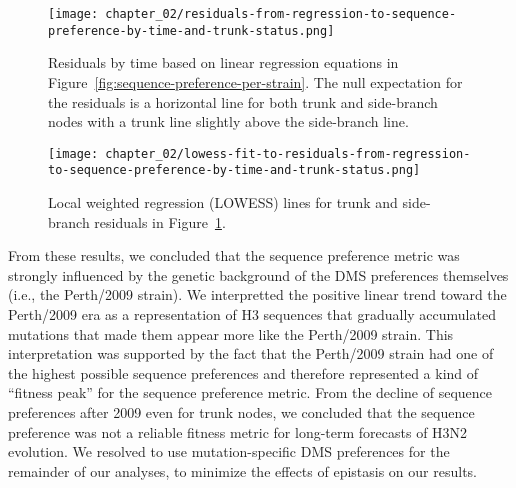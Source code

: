 \begin{figure}
  \centering
  \texttt{[image: chapter\_02/residuals-from-regression-to-sequence-preference-by-time-and-trunk-status.png]}
  \caption{\label{fig:residuals-from-regression-fit-to-sequence-preference-per-strain} Residuals by time based on linear regression equations in Figure~\ref{fig:sequence-preference-per-strain}.
    The null expectation for the residuals is a horizontal line for both trunk and side-branch nodes with a trunk line slightly above the side-branch line.}
\end{figure}

\begin{figure}
  \centering
  \texttt{[image: chapter\_02/lowess-fit-to-residuals-from-regression-to-sequence-preference-by-time-and-trunk-status.png]}
  \caption{\label{fig:lowess-residuals-from-regression-fit-to-sequence-preference-per-strain} Local weighted regression (LOWESS) lines for trunk and side-branch residuals in Figure~\ref{fig:residuals-from-regression-fit-to-sequence-preference-per-strain}.}
\end{figure}

From these results, we concluded that the sequence preference metric was strongly influenced by the genetic background of the DMS preferences themselves (i.e., the Perth/2009 strain).
We interpretted the positive linear trend toward the Perth/2009 era as a representation of H3 sequences that gradually accumulated mutations that made them appear more like the Perth/2009 strain.
This interpretation was supported by the fact that the Perth/2009 strain had one of the highest possible sequence preferences and therefore represented a kind of ``fitness peak'' for the sequence preference metric.
From the decline of sequence preferences after 2009 even for trunk nodes, we concluded that the sequence preference was not a reliable fitness metric for long-term forecasts of H3N2 evolution.
We resolved to use mutation-specific DMS preferences for the remainder of our analyses, to minimize the effects of epistasis on our results.
